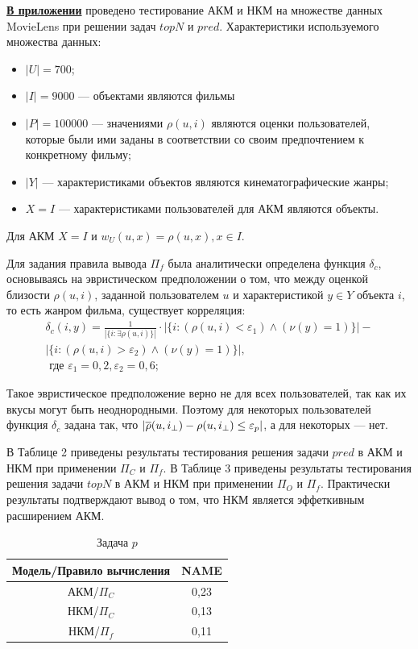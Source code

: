 {\underline {\bf В приложении}} проведено тестирование АКМ и НКМ на множестве данных MovieLens
при решении задач $topN$ и $pred$.
Характеристики используемого множества данных:
\begin{itemize}
	\item $|U| = 700$;
	\item $|I| = 9000$ --- объектами являются фильмы
	\item $|P| = 100 000$ --- значениями $\rho(u, i)$ являются оценки
		пользователей, которые были ими заданы в соответствии со своим
		предпочтением к конкретному фильму;
	\item $|Y|$ --- характеристиками объектов являются кинематографические
		жанры;
	\item $X = I$ --- характеристиками пользователей для АКМ являются объекты.
\end{itemize}

Для АКМ $X = I$ и $w_U(u, x) = \rho(u,x), x \in I$.

Для задания правила вывода $\Pi_f$ была аналитически определена
функция $\delta_c$, основываясь на эвристическом предположении о том,
что между оценкой близости $\rho(u, i)$, заданной пользователем $u$
и характеристикой $y \in Y$ объекта $i$,
то есть жанром фильма, существует корреляция:
\begin{multline}
	\delta_c(i, y) = \frac{1}{|\{i: \exists \rho(u,i)\}|}
	\cdot
	|\{ i : (\rho(u, i) < \varepsilon_1) \wedge (\nu(y) = 1)\}| -\\
	|\{ i : (\rho(u, i) > \varepsilon_2) \wedge (\nu(y) = 1)\}|, \\
	\text{ где }
	\varepsilon_1 = 0,2, \varepsilon_2 = 0,6;
\end{multline}

Такое эвристическое предположение верно не для всех пользователей, так как
их вкусы могут быть неоднородными. Поэтому для некоторых пользователей функция
$\delta_c$ задана так, что
$|\overline{\rho}(u, i_{\bot}) - \rho(u, i_{\bot}) \le \varepsilon_p|$,
а для некоторых --- нет.

В Таблице 2 приведены результаты тестирования решения задачи $pred$ в АКМ и НКМ при применении
$\Pi_{C}$ и $\Pi_f$.
В Таблице 3 приведены результаты тестирования решения задачи $topN$ в АКМ и НКМ при применении
$\Pi_{O}$ и $\Pi_f$.
Практически результаты подтверждают вывод о том, что НКМ является эффеткивным
расширением АКМ.

\begin{table}[htb]
	\caption{Задача $p$}
  \begin{center}
	\label{table:p}
	\begin{tabular}{|c|c|}
	  \hline
		Модель/Правило вычисления & NAME \\ \hline
		АКМ/$\Pi_{C}$&0,23 \\ \hline
		НКМ/$\Pi_{C}$&0,13 \\ \hline
		НКМ/$\Pi_{f}$&0,11 \\ \hline
	\end{tabular}
  \end{center}
\end{table}

